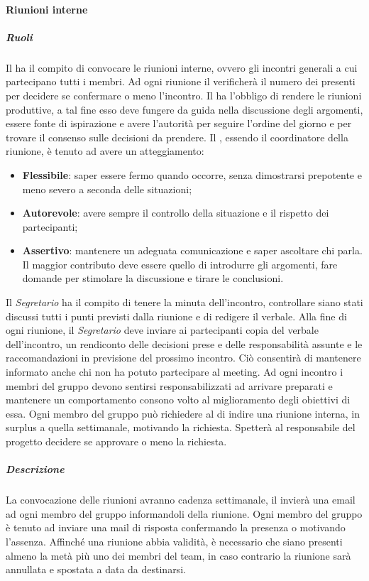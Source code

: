 \paragraph{Riunioni interne}
\subparagraph{Ruoli}
Il \textsl{\RdP} ha il compito di convocare le riunioni interne, ovvero gli incontri generali a cui partecipano tutti i membri.
Ad ogni riunione il \textsl{\RdP} verificherà il numero dei presenti per decidere se confermare o meno l'incontro.
Il \textsl{\RdP} ha l'obbligo di rendere le riunioni produttive, a tal fine 
esso deve fungere da guida nella discussione degli argomenti, essere fonte di ispirazione e avere l'autorità per seguire l'ordine del giorno e per trovare il consenso sulle decisioni da prendere.
Il \textsl{\RdP}, essendo il coordinatore della riunione, è tenuto ad avere un atteggiamento:
\begin{itemize}
\item
\textbf{Flessibile}: saper essere fermo quando occorre, senza dimostrarsi prepotente e meno severo a seconda delle situazioni;
\item
\textbf{Autorevole}: avere sempre il controllo della situazione e il rispetto dei partecipanti;
\item
\textbf{Assertivo}: mantenere un adeguata comunicazione e saper ascoltare chi parla. Il maggior contributo deve essere quello di introdurre gli argomenti, fare domande per stimolare la discussione e tirare le conclusioni.
\end{itemize}
Il \textsl{Segretario} ha il compito di tenere la minuta dell'incontro, controllare siano stati discussi tutti i punti previsti dalla riunione e di redigere
il verbale. Alla fine di ogni riunione, il \textsl{Segretario} deve inviare ai partecipanti copia del verbale dell'incontro, un rendiconto delle decisioni prese e delle responsabilità assunte e le raccomandazioni in previsione del prossimo incontro. Ciò consentirà di mantenere informato anche chi non ha potuto partecipare al meeting. 
Ad ogni incontro i membri del gruppo devono sentirsi responsabilizzati ad arrivare preparati e mantenere un comportamento consono volto al miglioramento degli obiettivi di essa.
Ogni membro del gruppo può richiedere al \textsl{\RdP} di indire una riunione interna, in surplus a quella settimanale, motivando la richiesta. Spetterà al responsabile del progetto decidere se approvare o meno la richiesta.
\subparagraph{Descrizione}
La convocazione delle riunioni avranno cadenza settimanale, il \textsl{\RdP} invierà una email ad ogni membro del gruppo informandoli della riunione.
Ogni membro del gruppo è tenuto ad inviare una mail di risposta confermando la presenza o motivando l'assenza.
Affinché una riunione abbia validità, è necessario che siano presenti almeno la metà più uno dei membri del team, in caso contrario la riunione sarà annullata e spostata a data da destinarsi.


